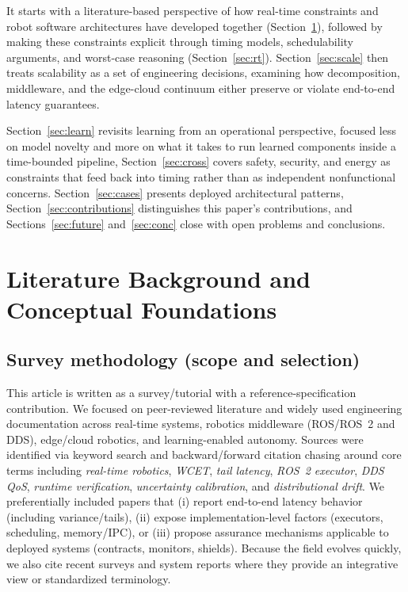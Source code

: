 \documentclass[smallextended]{svjour3}
\begin{document}
It starts with a literature-based perspective of how real-time constraints and robot software architectures have developed together (Section~\ref{sec:lit}), followed by making these constraints explicit through timing models, schedulability arguments, and worst-case reasoning (Section~\ref{sec:rt}). Section~\ref{sec:scale} then treats scalability as a set of engineering decisions, examining how decomposition, middleware, and the edge-cloud continuum either preserve or violate end-to-end latency guarantees.

Section~\ref{sec:learn} revisits learning from an operational perspective, focused less on model novelty and more on what it takes to run learned components inside a time-bounded pipeline, Section~\ref{sec:cross} covers safety, security, and energy as constraints that feed back into timing rather than as independent nonfunctional concerns. Section~\ref{sec:cases} presents deployed architectural patterns, Section~\ref{sec:contributions} distinguishes this paper's contributions, and Sections~\ref{sec:future} and~\ref{sec:conc} close with open problems and conclusions.

\section{Literature Background and Conceptual Foundations}
\label{sec:lit}

\subsection{Survey methodology (scope and selection)}
\label{subsec:survey_method}
This article is written as a survey/tutorial with a reference-specification contribution.
We focused on peer-reviewed literature and widely used engineering documentation across
real-time systems, robotics middleware (ROS/ROS~2 and DDS), edge/cloud robotics, and
learning-enabled autonomy. Sources were identified via keyword search and
backward/forward citation chasing around core terms including \emph{real-time robotics},
\emph{WCET}, \emph{tail latency}, \emph{ROS~2 executor}, \emph{DDS QoS}, \emph{runtime verification},
\emph{uncertainty calibration}, and \emph{distributional drift}. We preferentially included
papers that (i) report end-to-end latency behavior (including variance/tails), (ii) expose
implementation-level factors (executors, scheduling, memory/IPC), or (iii) propose assurance
mechanisms applicable to deployed systems (contracts, monitors, shields). Because the field
evolves quickly, we also cite recent surveys and system reports where they provide an
integrative view or standardized terminology.
\end{document}
